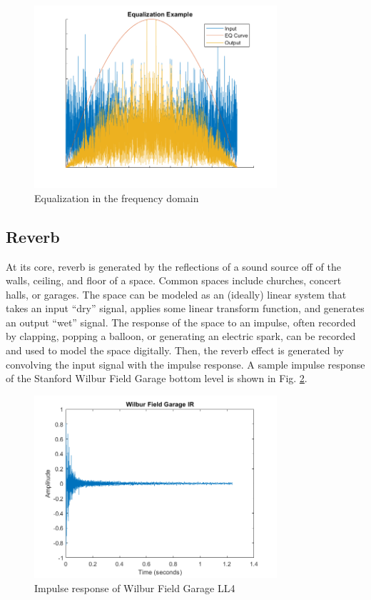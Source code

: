 \documentclass[conference]{IEEEtran}
\begin{document}
\begin{figure}[htbp]
    \centerline{\includegraphics[width=9cm]{eq_sample.png}}
    \caption{Equalization in the frequency domain}
    \label{fig:eq_sample}
\end{figure}

\subsection{Reverb}

At its core, reverb is generated by the reflections of a sound source off of the walls, ceiling, and floor of a space. Common spaces include churches, concert halls, or garages. The space can be modeled as an (ideally) linear system that takes an input ``dry'' signal, applies some linear transform function, and generates an output ``wet'' signal. The response of the space to an impulse, often recorded by clapping, popping a balloon, or generating an electric spark, can be recorded and used to model the space digitally. Then, the reverb effect is generated by convolving the input signal with the impulse response. A sample impulse response of the Stanford Wilbur Field Garage bottom level is shown in Fig. \ref{fig:wilbur_ir}.

\begin{figure}[htbp]
    \centerline{\includegraphics[width=9cm]{wilbur_ir.png}}
    \caption{Impulse response of Wilbur Field Garage LL4}
    \label{fig:wilbur_ir}
\end{figure}
\end{document}
